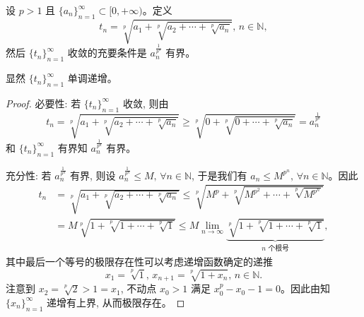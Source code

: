 \documentclass[../../main.tex]{subfiles}
\begin{document}
\begin{theorem}[Herschfeld判别法]\label{theorem:Herschfeld判别法}
设 \( p > 1 \) 且 \( \{a_n\}_{n = 1}^{\infty} \subset [0, +\infty) \)。定义
\[
t_n = \sqrt[p]{a_1 + \sqrt[p]{a_2 + \cdots + \sqrt[p]{a_n}}}, \, n \in \mathbb{N},
\]
然后 \( \{t_n\}_{n = 1}^{\infty} \) 收敛的充要条件是 \( a_n^{\frac{1}{p^n}} \) 有界。

显然 \( \{t_n\}_{n = 1}^{\infty} \) 单调递增。
\end{theorem}
\begin{proof}
{\heiti 必要性:} 若 \( \{t_n\}_{n = 1}^{\infty} \) 收敛, 则由
\[
t_n = \sqrt[p]{a_1 + \sqrt[p]{a_2 + \cdots + \sqrt[p]{a_n}}} \geqslant \sqrt[p]{0 + \sqrt[p]{0 + \cdots + \sqrt[p]{a_n}}} = a_n^{\frac{1}{p^n}}
\]
和 \( \{t_n\}_{n = 1}^{\infty} \) 有界知 \( a_n^{\frac{1}{p^n}} \) 有界。

{\heiti 充分性:} 若 \( a_n^{\frac{1}{p^n}} \) 有界, 则设 \( a_n^{\frac{1}{p^n}} \leqslant M, \, \forall n \in \mathbb{N} \), 于是我们有 \( a_n \leqslant M^{p^n}, \, \forall n \in \mathbb{N} \)。因此
\begin{align*}
t_n &= \sqrt[p]{a_1 + \sqrt[p]{a_2 + \cdots + \sqrt[p]{a_n}}} \leqslant \sqrt[p]{M^{p} + \sqrt[p]{M^{p^2} + \cdots + \sqrt[p]{M^{p^n}}}} \\
&= M\sqrt[p]{1 + \sqrt[p]{1 + \cdots + \sqrt[p]{1}}} \leqslant M \lim_{n \to \infty} \underbrace{\sqrt[p]{1 + \sqrt[p]{1 + \cdots + \sqrt[p]{1}}}}_{n \text{ 个根号}},
\end{align*}
其中最后一个等号的极限存在性可以考虑递增函数确定的递推
\[
x_1 = \sqrt[p]{1}, \, x_{n + 1} = \sqrt[p]{1 + x_n}, \, n \in \mathbb{N}.
\]
注意到 \( x_2 = \sqrt[p]{2} > 1 = x_1 \), 不动点 \( x_0 > 1 \) 满足 \( x_0^p - x_0 - 1 = 0 \)。因此由知 \( \{x_n\}_{n = 1}^{\infty} \) 递增有上界, 从而极限存在。
\end{proof}
\end{document}
